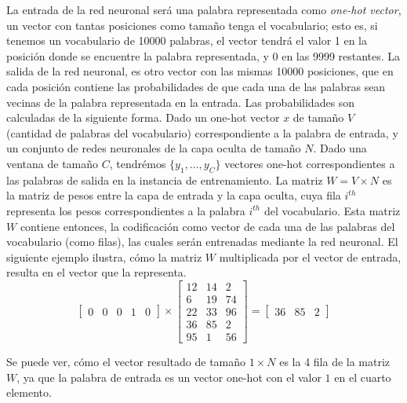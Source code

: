 \bigskip La entrada de la red neuronal será una palabra representada como \textit{one-hot vector}, un vector con tantas posiciones como tamaño tenga el vocabulario; esto es, si tenemos un vocabulario de 10000 palabras, el vector tendrá el valor 1 en la posición donde se encuentre la palabra representada, y 0 en las 9999 restantes. La salida de la red neuronal, es otro vector con las mismas 10000 posiciones, que en cada posición contiene las probabilidades de que cada una de las palabras sean vecinas de la palabra representada en la entrada. Las probabilidades son calculadas de la siguiente forma. Dado un one-hot vector \(x\) de tamaño \(V\) (cantidad de palabras del vocabulario) correspondiente a la palabra de entrada, y un conjunto de redes neuronales de la capa oculta de tamaño \(N\). Dado una ventana de tamaño \(C\), tendrémos \(\{y_1,...,y_C\}\) vectores one-hot correspondientes a las palabras de salida en la instancia de entrenamiento. La matriz \(W=V \times N\) es la matriz de pesos entre la capa de entrada y la capa oculta, cuya fila \(i^{th}\) representa los pesos correspondientes a la palabra \(i^{th}\) del vocabulario. Esta matriz \(W\) contiene entonces, la codificación como vector de cada una de las palabras del vocabulario (como filas), las cuales serán entrenadas mediante la red neuronal. El siguiente ejemplo ilustra, cómo la matriz \(W\) multiplicada por el vector de entrada, resulta en el vector que la representa.
\[\begin{bmatrix}0 & 0 & 0 & 1 & 0 \end{bmatrix} \times \begin{bmatrix}12 & 14 & 2 \\ 6 & 19 & 74 \\ 22 & 33 & 96 \\ 36 & 85 & 2 \\ 95 & 1 & 56 \end{bmatrix} = \begin{bmatrix} 36 & 85 & 2 \end{bmatrix}\]

Se puede ver, cómo el vector resultado de tamaño \(1 \times N\) es la 4 fila de la matriz \(W\), ya que la palabra de entrada es un vector one-hot con el valor \(1\) en el cuarto elemento.

